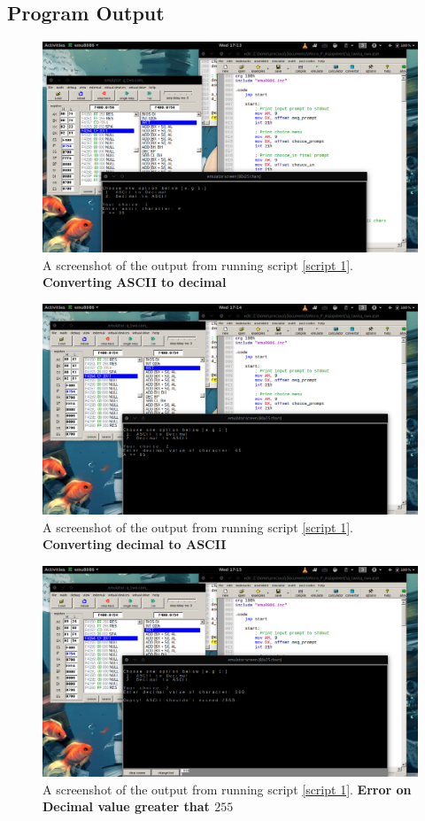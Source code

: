 \documentclass[]{article}
\begin{document}
\clearpage
\subsection{Program Output}

\begin{figure}[h]
	\includegraphics[width=12cm]{q_two/q2_ascii_to_dec.png}
	\centering
	\caption{A screenshot of the output from running script \ref{script 1}. \textbf{Converting ASCII to decimal}}
\end{figure}

\begin{figure}[h]
	\includegraphics[width=12cm]{q_two/q2_dec_to_ascii.png}
	\centering
	\caption{A screenshot of the output from running script \ref{script 1}. \textbf{Converting decimal to ASCII}}
\end{figure}


\begin{figure}[h]
	\includegraphics[width=12cm]{q_two/q2_input_gthan_255.png}
	\centering
	\caption{A screenshot of the output from running script \ref{script 1}. \textbf{Error on Decimal value greater that $255$}}
\end{figure}
\end{document}
